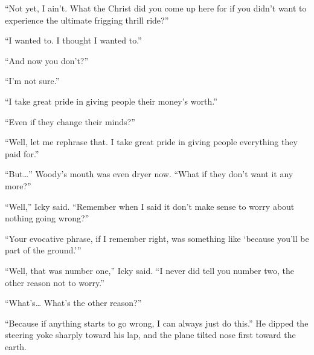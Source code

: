 “Not yet, I ain’t. What the Christ did you come up here for if you didn’t want to experience the ultimate frigging thrill ride?”

“I wanted to. I thought I wanted to.”

“And now you don’t?”

“I’m not sure.”

“I take great pride in giving people their money’s worth.”

“Even if they change their minds?”

“Well, let me rephrase that. I take great pride in giving people everything they paid for.”

“But…” Woody’s mouth was even dryer now. “What if they don’t want it any more?”

“Well,” Icky said. “Remember when I said it don’t make sense to worry about nothing going wrong?”

“Your evocative phrase, if I remember right, was something like ‘because you’ll be part of the ground.’”

“Well, that was number one,” Icky said. “I never did tell you number two, the other reason not to worry.”

“What’s… What’s the other reason?”

“Because if anything starts to go wrong, I can always just do this.” He dipped the steering yoke sharply toward his lap, and the plane tilted nose first toward the earth.
